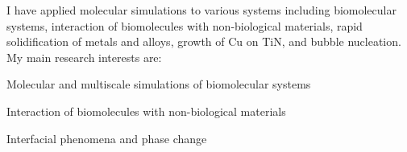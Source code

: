 
\begin{cventries}
  \cventry
    {}
    {}
    {}
    {}
    {
    I have applied molecular simulations to various systems including biomolecular systems, interaction of biomolecules with non-biological materials, rapid solidification of metals and alloys, growth of Cu on TiN, and bubble nucleation. My main research interests are:
    \vspace{15pt}
      \begin{cvitems} %
        \item {Molecular and multiscale simulations of biomolecular systems}
		\item {Interaction of biomolecules with non-biological materials}
		\item {Interfacial phenomena and phase change}
      \end{cvitems}
    }
\end{cventries}
